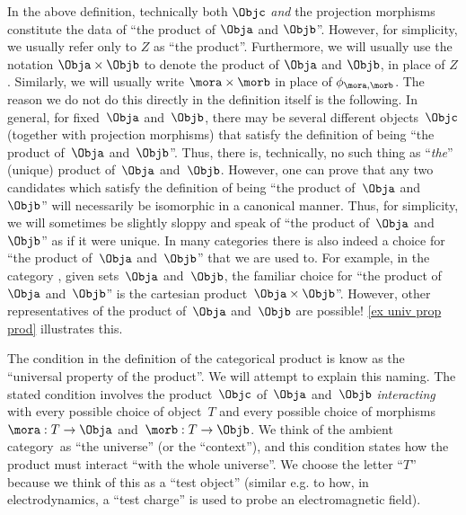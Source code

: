 \begin{remark}
  \label{prod unique up to iso}
  In the above definition, technically both $\Objc$ \emph{and} the projection morphisms constitute the data of ``the product of $\Obja$ and $\Objb$''. However, for simplicity, we usually refer only to $Z$ as ``the product''. Furthermore, we will usually use the notation $\Obja \times \Objb$ to denote the product of $\Obja$ and $\Objb$, in place of $Z$. Similarly, we will usually write $\mora \times \morb$ in place of $\phi_{\mora, \morb}$. The reason we do not do this directly in the definition itself is the following. In general, for fixed~$\Obja$ and~$\Objb$, there may be several different objects~$\Objc$ (together with projection morphisms) that satisfy the definition of being ``the product of~$\Obja$ and~$\Objb$''. Thus, there is, technically, no such thing as ``\emph{the}'' (unique) product of~$\Obja$ and~$\Objb$. However, one can prove that any two candidates which satisfy the definition of being ``the product of~$\Obja$ and~$\Objb$'' will necessarily be isomorphic in a canonical manner. Thus, for simplicity, we will sometimes be slightly sloppy and speak of ``the product of~$\Obja$ and~$\Objb$'' as if it were unique. In many categories there is also indeed a choice for ``the product of~$\Obja$ and~$\Objb$'' that we are used to. For example, in the category \Set, given sets~$\Obja$ and~$\Objb$, the familiar choice for ``the product of~$\Obja$ and~$\Objb$'' is the cartesian product~$\Obja \times \Objb$''. However, other representatives of the product of~$\Obja$ and~$\Objb$ are possible! \cref{ex univ prop prod} illustrates this.
\end{remark}

\begin{remark}
  The condition in the definition of the categorical product is know as the ``universal property of the product''. We will attempt to explain this naming. The stated condition involves the product~$\Objc$ of~$\Obja$ and~$\Objb$ \emph{interacting} with every possible choice of object~$T$ and every possible choice of morphisms~$\mora : T \to \Obja$ and~$\morb: T \to \Objb$. We think of the ambient category~\CatC as ``the universe'' (or the ``context''), and this condition states how the product must interact ``with the whole universe''.
  We choose the letter ``$T$'' because we think of this as a ``test object'' (similar e.g. to how, in electrodynamics, a ``test charge'' is used to probe an electromagnetic field).
\end{remark}


